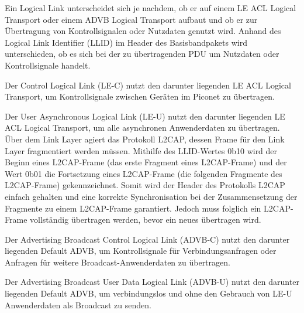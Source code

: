 Ein Logical Link unterscheidet sich je nachdem, ob er auf einem LE ACL Logical Transport oder einem ADVB Logical Transport aufbaut und ob er zur Übertragung von Kontrollsignalen oder Nutzdaten genutzt wird. Anhand des Logical Link Identifier (LLID) im Header des Basisbandpakets wird unterschieden, ob es sich bei der zu übertragenden PDU um Nutzdaten oder Kontrollsignale handelt.

Der Control Logical Link (LE-C) nutzt den darunter liegenden LE ACL Logical Transport, um Kontrollsignale zwischen Geräten im Piconet zu übertragen.

Der User Asynchronous Logical Link (LE-U) nutzt den darunter liegenden LE ACL Logical Transport, um alle asynchronen Anwenderdaten zu übertragen. Über dem Link Layer agiert das Protokoll L2CAP, dessen Frame für den Link Layer fragmentiert werden müssen. Mithilfe des LLID-Wertes 0b10 wird der Beginn eines L2CAP-Frame (das erste Fragment eines L2CAP-Frame) und der Wert 0b01 die Fortsetzung eines L2CAP-Frame (die folgenden Fragmente des L2CAP-Frame) gekennzeichnet. Somit wird der Header des Protokolls L2CAP einfach gehalten und eine korrekte Synchronisation bei der Zusammensetzung der Fragmente zu einem L2CAP-Frame garantiert. Jedoch muss folglich ein L2CAP-Frame vollständig übertragen werden, bevor ein neues übertragen wird.

Der Advertising Broadcast Control Logical Link (ADVB-C) nutzt den darunter liegenden Default ADVB, um Kontrollsignale für Verbindungsanfragen oder Anfragen für weitere Broadcast-Anwenderdaten zu übertragen.

Der Advertising Broadcast User Data Logical Link (ADVB-U) nutzt den darunter liegenden Default ADVB, um verbindungslos und ohne den Gebrauch von LE-U Anwenderdaten als Broadcast zu senden.
